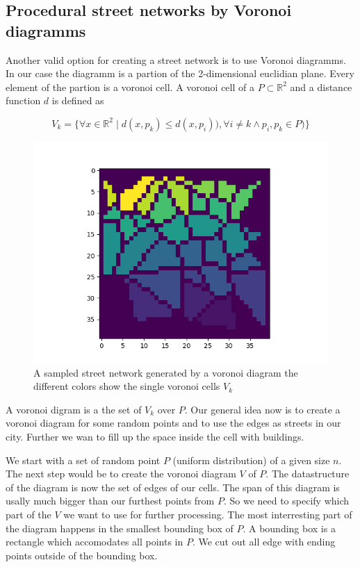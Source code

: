 \documentclass{scrartcl}
\begin{document}
\subsection{Procedural street networks by Voronoi diagramms}

Another valid option for creating a street network is to use Voronoi diagramms.
In our case the diagramm is a partion of the 2-dimensional euclidian plane.
Every element of the partion is a voronoi cell.
A voronoi cell of a  $ P \subset \mathbb{R}^2 $ and a distance function $d$ is defined as

\[
    V_k=\lbrace \forall x \in \mathbb{R}^2 \mid d(x,p_k) \leq d(x,p_i)), \forall i \ne k \land p_i,p_k \in P ) \rbrace
\]

\begin{figure}
    \centering
    \includegraphics[scale = 0.5]{voro}
    \caption{A sampled street network generated by a voronoi diagram
    the different colors show the single voronoi cells $V_k$} 
    \label{fig:voronoi}
\end{figure}

A voronoi digram is a the set of $V_k$ over $P$.
Our general idea now is to create a voronoi diagram for some random points
and to use the edges as streets in our city. Further we wan to fill up the
space inside the cell with buildings.

We  start with a set of random point $P$ (uniform distribution) of a given 
size $n$. The next step would be to create the voronoi diagram $V$ of $P$.
The datastructure of the diagram is now the set of edges of our cells.
The span of this diagram is usally much bigger than our furthest points from $P$. 
So we need to specify which part of the $V$ we want to use for further processing. 
The most interresting part of the diagram happens in the smallest bounding 
box of $P$. A bounding box is a rectangle which
accomodates all points in $P$. We cut out all edge with ending points outside 
of the bounding box.
\end{document}
